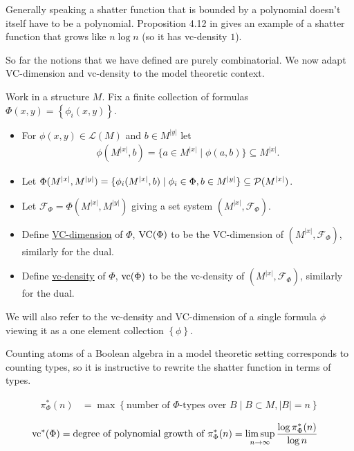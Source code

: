 \documentclass{amsart}
\newcommand{\F}{\mathcal F}
\renewcommand{\LL}{\mathcal L}
\newcommand{\defn}{\underline}
\newcommand{\curly}[1]{\left\{#1\right\}}
\begin{document}
Generally speaking a shatter function that is bounded by a polynomial doesn't itself have to be a polynomial.
Proposition 4.12 in \cite{vc_density} gives an example of a shatter function that grows like $n \log n$ (so it has vc-density $1$).

So far the notions that we have defined are purely combinatorial.
We now adapt VC-dimension and vc-density to the model theoretic context.

\begin{Definition}
  Work in a structure $M$.
  Fix a finite collection of formulas $\Phi(x, y) = \curly{\phi_i(x, y)}$.

  \begin{itemize}
  \item For $\phi(x, y) \in \LL(M)$ and $b \in M^{|y|}$ let 
    \begin{align*}
      \phi(M^{|x|}, b) = \{a \in M^{|x|} \mid \phi(a, b)\} \subseteq M^{|x|}.
    \end{align*}
  \item Let $\Phi(M^{|x|}, M^{|y|})= \{\phi_i(M^{|x|}, b) \mid \phi_i \in \Phi, b \in M^{|y|}\} \subseteq \mathcal P(M^{|x|})$.
  \item Let $\F_\Phi = \Phi(M^{|x|}, M^{|y|})$ giving a set system $(M^{|x|}, \F_\Phi)$.
  \item Define \defn{VC-dimension} of $\Phi$, $\operatorname{VC}(\Phi)$ to be the VC-dimension of $(M^{|x|}, \F_\Phi)$, similarly for the dual.
  \item Define \defn{vc-density} of $\Phi$, $\operatorname{vc}(\Phi)$ to be the vc-density of $(M^{|x|}, \F_\Phi)$, similarly for the dual.
  \end{itemize}

  We will also refer to the vc-density and VC-dimension of a single formula $\phi$
  viewing it as a one element collection $\curly{\phi}$.
\end{Definition}

Counting atoms of a Boolean algebra in a model theoretic setting corresponds to counting types,
so it is instructive to rewrite the shatter function in terms of types.

\begin{Definition} 
  \begin{align*}
    \pi^*_\Phi(n) &= \max \curly{\text{number of $\Phi$-types over $B$} \mid B \subset M, |B| = n}
  \end{align*}
\end{Definition}  

\begin{Lemma} \label{count_types}
  \begin{align*}
    \operatorname{vc}^*(\Phi) &= \text{degree of polynomial growth of $\pi^*_\Phi(n)$}  = \limsup_{n \to \infty}\frac{\log \pi^*_\Phi(n)}{\log n}
  \end{align*}  
\end{Lemma}
\end{document}
